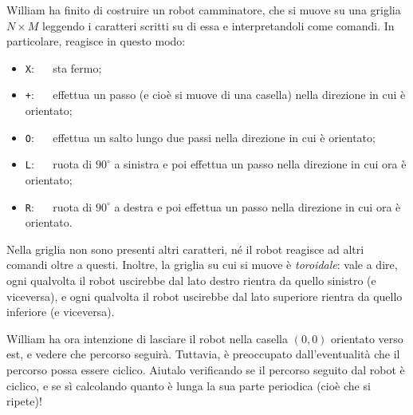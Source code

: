 \usepackage{xcolor}
\usepackage{afterpage}
\usepackage{pifont,mdframed}
\usepackage[bottom]{footmisc}

\makeatletter
\gdef\this@inputfilename{input.txt}
\gdef\this@outputfilename{output.txt}
\makeatother

\newcommand{\inputfile}{\texttt{input.txt}}
\newcommand{\outputfile}{\texttt{output.txt}}

\newenvironment{warning}
  {\par\begin{mdframed}[linewidth=2pt,linecolor=gray]%
    \begin{list}{}{\leftmargin=1cm
                   \labelwidth=\leftmargin}\item[\Large\ding{43}]}
  {\end{list}\end{mdframed}\par}

	William ha finito di costruire un robot camminatore, che si muove su una griglia $N \times M$ leggendo i caratteri scritti su di essa e interpretandoli come comandi. In particolare, reagisce in questo modo:
	\begin{itemize}
		\item \texttt{X}: $\quad$ sta fermo;
		\item \texttt{+}: $\quad$ effettua un passo (e cioè si muove di una casella) nella direzione in cui è orientato;
		\item \texttt{O}: $\quad$ effettua un salto lungo due passi nella direzione in cui è orientato;
		\item \texttt{L}: $\quad$ ruota di $90^\circ$ a sinistra e poi effettua un passo nella direzione in cui ora è orientato;
		\item \texttt{R}: $\quad$ ruota di $90^\circ$ a destra e poi effettua un passo nella direzione in cui ora è orientato.
	\end{itemize}
	Nella griglia non sono presenti altri caratteri, né il robot reagisce ad altri comandi oltre a questi.
	Inoltre, la griglia su cui si muove è \emph{toroidale}: vale a dire, ogni qualvolta il robot uscirebbe dal lato destro rientra da quello sinistro (e viceversa), e ogni qualvolta il robot uscirebbe dal lato superiore rientra da quello inferiore (e viceversa).

	William ha ora intenzione di lasciare il robot nella casella $(0,0)$ orientato verso est, e vedere che percorso seguirà. Tuttavia, è preoccupato dall'eventualità che il percorso possa essere ciclico. Aiutalo verificando se il percorso seguito dal robot è ciclico, e se sì calcolando quanto è lunga la sua parte periodica (cioè che si ripete)!

